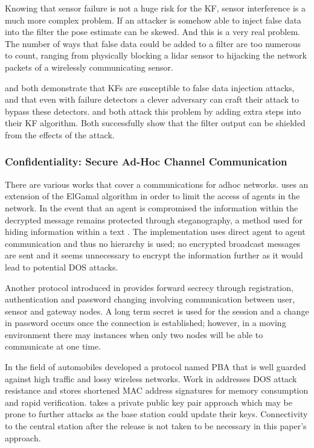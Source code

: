 \documentclass[conference]{IEEEtran}
\begin{document}
Knowing that sensor failure is not a huge risk for the KF, sensor interference is a much more complex problem. If an attacker is somehow able to inject false data into the filter the pose estimate can be skewed. And this is a very real problem. The number of ways that false data could be added to a filter are too numerous to count, ranging from physically blocking a lidar sensor to hijacking the network packets of a wirelessly communicating sensor.

\cite{Mo2010} and \cite{Yang2013} both demonstrate that KFs are susceptible to false data injection attacks, and that even with failure detectors a clever adversary can craft their attack to bypass these detectors. \cite{Bezzo_2014} and \cite{Mo2014} both attack this problem by adding extra steps into their KF algorithm. Both successfully show that the filter output can be shielded from the effects of the attack.


\subsubsection{Confidentiality: Secure Ad-Hoc Channel Communication}
There are various works that cover a communications for adhoc networks. \cite{vegh2014securing} uses an extension of the ElGamal algorithm in order to limit the access of agents in the network. In the event that an agent is compromised the information within the decrypted message remains protected through steganography, a method used for hiding information within a text \cite{adi2009mechatronic}. The implementation uses direct agent to agent communication and thus no hierarchy is used; no encrypted broadcast messages are sent and it seems unnecessary to encrypt the information further as it would lead to potential DOS attacks.

Another protocol introduced in \cite{chang2016provably} provides forward secrecy through registration, authentication and password changing involving communication between user, sensor and gateway nodes. A long term secret is used for the session and a change in password occurs once the connection is established; however, in a moving environment there may instances when only two nodes will be able to communicate at one time.

In the field of automobiles \cite{lyu2016pba} developed a protocol named PBA that is well guarded against high traffic and lossy wireless networks. Work in \cite{lyu2016pba} addresses DOS attack resistance and stores shortened MAC address signatures for memory consumption and rapid verification. \cite{lyu2016pba} takes a private public key pair approach which may be prone to further attacks as the base station could update their keys. Connectivity to the central station after the release is not taken to be necessary in this paper's approach.
\end{document}
